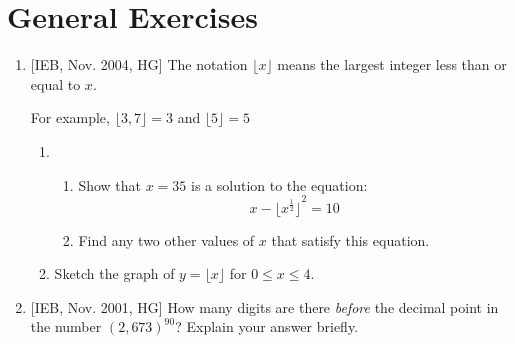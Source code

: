 \chapter{General Exercises}

\begin{enumerate}

\item{[IEB, Nov. 2004, HG] The notation $\lfloor x \rfloor$ means the largest integer less than or equal to $x$.

For example, $\lfloor 3,7 \rfloor = 3$ and $\lfloor 5 \rfloor = 5$
\begin{enumerate}
\item{
\begin{enumerate}
\item{Show that $x=35$ is a solution to the equation: $$x - {\biggl \lfloor x^{\tfrac{1}{2}} \biggr \rfloor}^2 = 10$$}
\item{Find any two other values of $x$ that satisfy this equation.}
\end{enumerate}}
\item{Sketch the graph of $y=\lfloor x \rfloor$ for $0 \leq x \leq 4$.}
\end{enumerate}}

\item{[IEB, Nov. 2001, HG] How many digits are there \textit{before} the decimal point in the number $(2,673)^{90}$? Explain your answer briefly.}

\end{enumerate}

